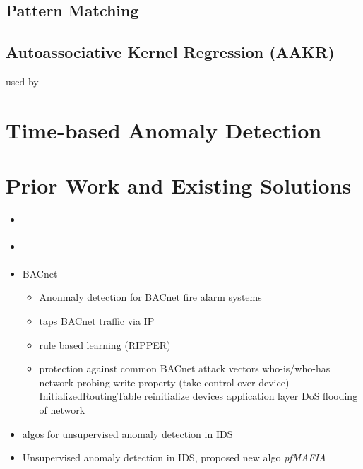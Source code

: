 	\subsection{Pattern Matching}
	\subsection{Autoassociative Kernel Regression (AAKR)}
		used by \textcite{Yang2006}

\section{Time-based Anomaly Detection}

\section{Prior Work and Existing Solutions}
\begin{itemize}
	\item \parencite{Yang2006}
	\item \parencite{Celeda2012}
	\item \textcite{Pan2014} BACnet
		\begin{itemize}
			\item Anonmaly detection for BACnet fire alarm systems
			\item taps BACnet traffic via IP
			\item rule based learning (RIPPER)
			\item protection against common BACnet attack vectors
				\subitem who-is/who-has network probing
				\subitem write-property (take control over device)
				\subitem InitializedRoutingTable
				\subitem reinitialize devices
				\subitem application layer DoS
				\subitem flooding of network
		\end{itemize}
	
	\item \textcite{Eskin2002} algos for unsupervised anomaly detection in IDS
	\item \textcite{Leung2005} Unsupervised anomaly detection in IDS, proposed new algo \emph{pfMAFIA}
\end{itemize}

